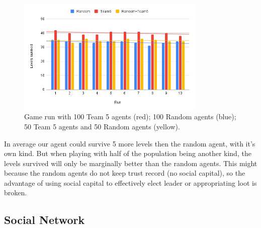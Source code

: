 \begin{figure}[!ht]
    \centering
    \includegraphics[width=0.8\textwidth]{008_team_5_agent_design/images/Team5vsRandom.png}
    \caption{Game run with 100 Team 5 agents (red); 100 Random agents (blue); 50 Team 5 agents and 50 Random agents (yellow).}
    \label{fig:Team5vsRandom}
\end{figure}

In average our agent could survive 5 more levels then the random agent, with it's own kind. But when playing with half of the population being another kind, the levels survived will only be marginally better than the random agents. This might because the random agents do not keep trust record (no social capital), so the advantage of using social capital to effectively elect leader or appropriating loot is broken.

\subsection{Social Network}

